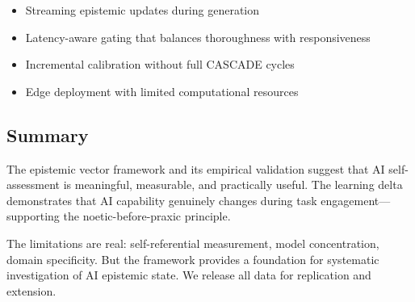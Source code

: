 \begin{itemize}
    \item Streaming epistemic updates during generation
    \item Latency-aware gating that balances thoroughness with responsiveness
    \item Incremental calibration without full CASCADE cycles
    \item Edge deployment with limited computational resources
\end{itemize}

\subsection{Summary}

The epistemic vector framework and its empirical validation suggest that AI self-assessment is meaningful, measurable, and practically useful. The learning delta demonstrates that AI capability genuinely changes during task engagement---supporting the noetic-before-praxic principle.

The limitations are real: self-referential measurement, model concentration, domain specificity. But the framework provides a foundation for systematic investigation of AI epistemic state. We release all data for replication and extension.
